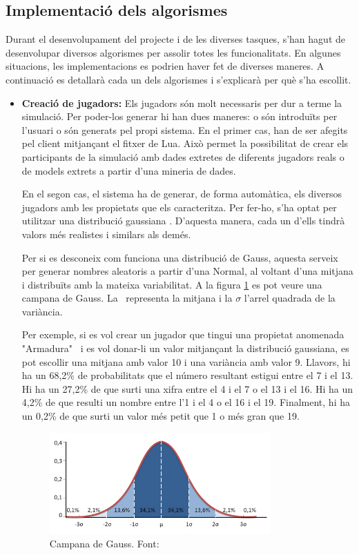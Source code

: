 \documentclass[a4paper]{article}
\begin{document}
\newpage
\subsection{Implementació dels algorismes}
Durant el desenvolupament del projecte i de les diverses tasques, s'han hagut de desenvolupar diversos algorismes per assolir totes les funcionalitats. En algunes situacions, les implementacions es podrien haver fet de diverses maneres. A continuació es detallarà cada un dels algorismes i s'explicarà per què s'ha escollit.

\begin{itemize}
    \item \textbf{Creació de jugadors:} Els jugadors són molt necessaris per dur a terme la simulació. Per poder-los generar hi han dues maneres: o són introduïts per l'usuari o són generats pel propi sistema. En el primer cas, han de ser afegits pel client mitjançant el fitxer de Lua. Això permet la possibilitat de crear els participants de la simulació amb dades extretes de diferents jugadors reals o de models extrets a partir d'una mineria de dades.
    
    En el segon cas, el sistema ha de generar, de forma automàtica, els diversos jugadors amb les propietats que els caracteritza. Per fer-ho, s'ha optat per utilitzar una distribució gaussiana \cite{wikipediaGauss}. D'aquesta manera, cada un d'ells tindrà valors més realistes i similars als demés. 
    
    Per si es desconeix com funciona una distribució de Gauss, aquesta serveix per generar nombres aleatoris a partir d'una Normal, al voltant d'una mitjana i distribuïts amb la mateixa variabilitat. A la figura \ref{fig:campanaGaussImage} es pot veure una campana de Gauss. La \textmu \, representa la mitjana i la $\sigma$ l'arrel quadrada de la variància.
    
    Per exemple, si es vol crear un jugador que tingui una propietat anomenada "Armadura" \, i es vol donar-li un valor mitjançant la distribució gaussiana, es pot escollir una mitjana amb valor 10 i una variància amb valor 9. Llavors, hi ha un 68,2\% de probabilitats que el número resultant estigui entre el 7 i el 13. Hi ha un 27,2\% de que surti una xifra entre el 4 i el 7 o el 13 i el 16. Hi ha un 4,2\% de que resulti un nombre entre l'1 i el 4 o el 16 i el 19. Finalment, hi ha un 0,2\% de que surti un valor més petit que 1 o més gran que 19. 
    
        \begin{figure}[H]
        \centering
        \includegraphics[width=0.8\textwidth]{images/gaussImage.jpg}
        \caption{Campana de Gauss. Font: \cite{campanaGauss}}
        \label{fig:campanaGaussImage}
    \end{figure}
    

\end{itemize}
\end{document}

